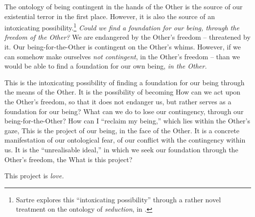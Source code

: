 The ontology of being contingent in the hands of the Other is the source of our existential terror in the first place. However, it is also the source of an intoxicating possibility.\footnote{Sartre explores this \enquote{intoxicating possibility} through a rather novel treatment on the ontology of \emph{seduction}, in \autocite[492]{Sartre}.} \emph{Could we find a foundation for our being, through the freedom of the Other?} We are endangered by the Other's freedom -- threatened by it. Our being-for-the-Other is contingent on the Other's whims. However, if we can somehow make ourselves \emph{not contingent}, in the Other's freedom -- than we would be able to find a foundation for our own being, \emph{in the Other.}

This is the intoxicating possibility of finding a foundation for our being through the means of the Other. It is the possibility of becoming  How can we act upon the Other's freedom, so that it does not endanger us, but rather serves as a foundation for our being? What can we do to lose our contingency, through our being-for-the-Other? How can I \enquote{reclaim my being,} which lies within the Other's gaze,  This is the project of our being, in the face of the Other. It is a concrete manifestation of our ontological fear, of our conflict with the contingency within us. It is the \enquote{unrealisable ideal,} in which we seek our foundation through the Other's freedom, the  What is this project?

\noindent
This project is \emph{love.}